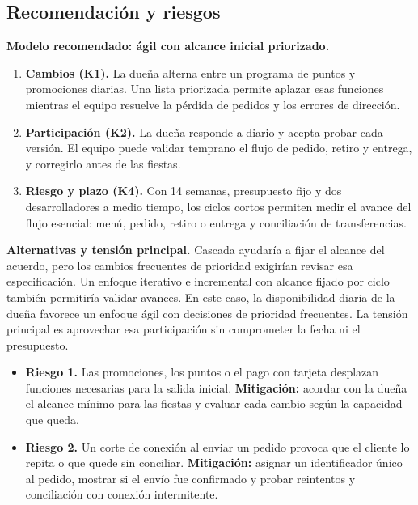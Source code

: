 \documentclass[11pt,a4paper]{article}
\begin{document}
\subsection{Recomendación y riesgos}

\textbf{Modelo recomendado: ágil con alcance inicial priorizado.}

\begin{enumerate}
    \item \textbf{Cambios (K1).} La dueña alterna entre un programa de puntos y promociones diarias. Una lista priorizada permite aplazar esas funciones mientras el equipo resuelve la pérdida de pedidos y los errores de dirección.
    \item \textbf{Participación (K2).} La dueña responde a diario y acepta probar cada versión. El equipo puede validar temprano el flujo de pedido, retiro y entrega, y corregirlo antes de las fiestas.
    \item \textbf{Riesgo y plazo (K4).} Con 14 semanas, presupuesto fijo y dos desarrolladores a medio tiempo, los ciclos cortos permiten medir el avance del flujo esencial: menú, pedido, retiro o entrega y conciliación de transferencias.
\end{enumerate}

\textbf{Alternativas y tensión principal.}
Cascada ayudaría a fijar el alcance del acuerdo, pero los cambios frecuentes de prioridad exigirían revisar esa especificación. Un enfoque iterativo e incremental con alcance fijado por ciclo también permitiría validar avances. En este caso, la disponibilidad diaria de la dueña favorece un enfoque ágil con decisiones de prioridad frecuentes. La tensión principal es aprovechar esa participación sin comprometer la fecha ni el presupuesto.

\begin{itemize}
    \item \textbf{Riesgo 1.} Las promociones, los puntos o el pago con tarjeta desplazan funciones necesarias para la salida inicial.
    \newline
    \textbf{Mitigación:} acordar con la dueña el alcance mínimo para las fiestas y evaluar cada cambio según la capacidad que queda.
    \item \textbf{Riesgo 2.} Un corte de conexión al enviar un pedido provoca que el cliente lo repita o que quede sin conciliar.
    \newline
    \textbf{Mitigación:} asignar un identificador único al pedido, mostrar si el envío fue confirmado y probar reintentos y conciliación con conexión intermitente.
\end{itemize}
\end{document}

